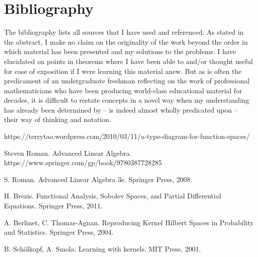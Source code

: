 \documentclass[psamsfonts]{amsart}
\theoremstyle{definition}
\theoremstyle{remark}
\numberwithin{equation}{section}
\begin{document}
\section{Bibliography}  
The bibliography lists all sources that I have used and referenced. As stated in the abstract, I make no claim on the originality of the work beyond the order in which material has been presented and my solutions to the problems. I have elucidated on points in theorems where I have been able to and/or thought useful for ease of exposition if I were learning this material anew. But as is often the predicament of an undergraduate freshman reflecting on the work of professional mathematicians who have been producing world-class educational material for decades, it is difficult to restate concepts in a novel way when my understanding has already been determined by -- is indeed almost wholly predicated upon -- their way of thinking and notation.


\begin{thebibliography}{9}

 https://terrytao.wordpress.com/2010/03/11/a-type-diagram-for-function-spaces/

Steven Roman.
Advanced Linear Algebra.
https://www.springer.com/gp/book/9780387728285

S. Roman. 
Advanced Linear Algebra 3e. 
Springer Press, 2008.

H. Brezis.
Functional Analysis, Sobolev Spaces, and Partial Differential Equations.
Springer Press, 2011. 

A. Berlinet, C. Thomas-Agnan. 
Reproducing Kernel Hilbert Spaces in Probability and Statistics. 
Springer Press, 2004. 

B. Sch\"{o}lkopf, A. Smola. 
Learning with kernels. 
MIT Press, 2001. 

\end{thebibliography}
\end{document}
